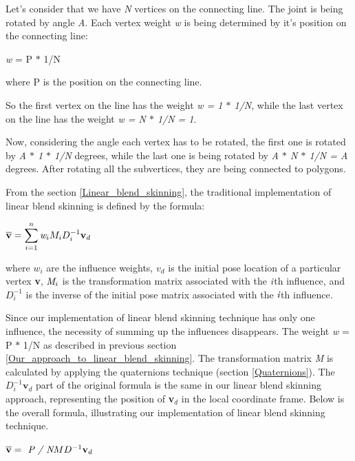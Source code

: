 \documentclass[times, 10pt,twocolumn]{article}
\begin{document}
Let's consider that we have \emph{N} vertices on the connecting line. The joint is being rotated by angle \emph{A}. Each vertex weight \emph{w} is being determined by it's position on the connecting line:

\begin{center}
\emph{w} = P $\ast$ 1/N
\end{center}
where P is the position on the connecting line.

So the first vertex on the line has the weight \emph{w = 1 $\ast$ 1/N}, while the last vertex on the line has the weight \emph{w =  N $\ast$ 1/N = 1}.

Now, considering the angle each vertex has to be rotated, the first one is rotated by \emph{A $\ast$ 1 $\ast$ 1/N} degrees, while the last one is being rotated by \emph{A $\ast$ N $\ast$  1/N = A} degrees. After rotating all the subvertices, they are being connected to polygons.

\label{relation}

From the section \ref{Linear_blend_skinning}, the traditional implementation of linear blend skinning is defined by the formula:
\begin{center}
$ \overline{\textbf{v}} = \displaystyle\sum_{i=1}^n\emph{w}_{i}M_{i}D_{i}^{-1}\textbf{v}_{d} $
\end{center}
where $w_{i}$ are the influence weights, $v_{d}$ is the initial pose location of a
particular vertex \textbf{v}, $\emph{M}_{i}$ is the transformation matrix associated with
the $\emph{i}$th influence, and $D_{i}^{-1}$ is the inverse of the initial pose matrix
associated with the $\emph{i}$th influence. 

Since our implementation of linear blend skinning technique has only one influence, the necessity of summing up the influences disappears. The weight \emph{w} = P $\ast$ 1/N as described in previous section \ref{Our_approach_to_linear_blend_skinning}. The transformation matrix \emph{M} is calculated by applying the quaternions technique (section \ref{Quaternions}). The $D_{i}^{-1}\textbf{v}_{d}$ part of the original formula is the same in our linear blend skinning approach, representing the position of \textbf{v$_{d}$} in the local coordinate frame. Below is the overall formula, illustrating our implementation of linear blend skinning technique.
\begin{center}
$ \overline{\textbf{v}} = \emph{ P / N}MD^{-1}\textbf{v}_{d} $
\end{center}
\end{document}
